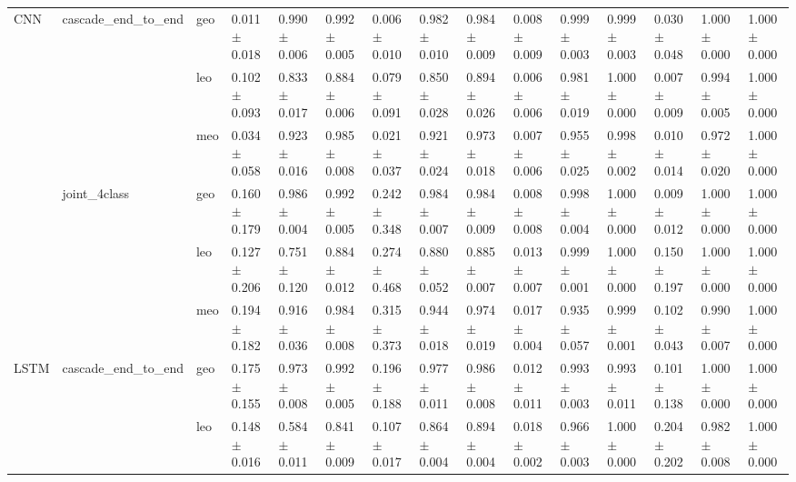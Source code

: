 \begin{table}
\begin{tabular}{lllllllllllllll}
CNN & cascade_end_to_end & geo &  0.011 $\pm$ 0.018 &  0.990 $\pm$ 0.006 &          0.992 $\pm$ 0.005 &  0.006 $\pm$ 0.010 &  0.982 $\pm$ 0.010 &          0.984 $\pm$ 0.009 &  0.008 $\pm$ 0.009 &  0.999 $\pm$ 0.003 &          0.999 $\pm$ 0.003 &  0.030 $\pm$ 0.048 &  1.000 $\pm$ 0.000 &          1.000 $\pm$ 0.000 \\
            &              & leo &  0.102 $\pm$ 0.093 &  0.833 $\pm$ 0.017 &          0.884 $\pm$ 0.006 &  0.079 $\pm$ 0.091 &  0.850 $\pm$ 0.028 &          0.894 $\pm$ 0.026 &  0.006 $\pm$ 0.006 &  0.981 $\pm$ 0.019 &          1.000 $\pm$ 0.000 &  0.007 $\pm$ 0.009 &  0.994 $\pm$ 0.005 &          1.000 $\pm$ 0.000 \\
            &              & meo &  0.034 $\pm$ 0.058 &  0.923 $\pm$ 0.016 &          0.985 $\pm$ 0.008 &  0.021 $\pm$ 0.037 &  0.921 $\pm$ 0.024 &          0.973 $\pm$ 0.018 &  0.007 $\pm$ 0.006 &  0.955 $\pm$ 0.025 &          0.998 $\pm$ 0.002 &  0.010 $\pm$ 0.014 &  0.972 $\pm$ 0.020 &          1.000 $\pm$ 0.000 \\
            & joint_4class & geo &  0.160 $\pm$ 0.179 &  0.986 $\pm$ 0.004 &          0.992 $\pm$ 0.005 &  0.242 $\pm$ 0.348 &  0.984 $\pm$ 0.007 &          0.984 $\pm$ 0.009 &  0.008 $\pm$ 0.008 &  0.998 $\pm$ 0.004 &          1.000 $\pm$ 0.000 &  0.009 $\pm$ 0.012 &  1.000 $\pm$ 0.000 &          1.000 $\pm$ 0.000 \\
            &              & leo &  0.127 $\pm$ 0.206 &  0.751 $\pm$ 0.120 &          0.884 $\pm$ 0.012 &  0.274 $\pm$ 0.468 &  0.880 $\pm$ 0.052 &          0.885 $\pm$ 0.007 &  0.013 $\pm$ 0.007 &  0.999 $\pm$ 0.001 &          1.000 $\pm$ 0.000 &  0.150 $\pm$ 0.197 &  1.000 $\pm$ 0.000 &          1.000 $\pm$ 0.000 \\
            &              & meo &  0.194 $\pm$ 0.182 &  0.916 $\pm$ 0.036 &          0.984 $\pm$ 0.008 &  0.315 $\pm$ 0.373 &  0.944 $\pm$ 0.018 &          0.974 $\pm$ 0.019 &  0.017 $\pm$ 0.004 &  0.935 $\pm$ 0.057 &          0.999 $\pm$ 0.001 &  0.102 $\pm$ 0.043 &  0.990 $\pm$ 0.007 &          1.000 $\pm$ 0.000 \\
LSTM & cascade_end_to_end & geo &  0.175 $\pm$ 0.155 &  0.973 $\pm$ 0.008 &          0.992 $\pm$ 0.005 &  0.196 $\pm$ 0.188 &  0.977 $\pm$ 0.011 &          0.986 $\pm$ 0.008 &  0.012 $\pm$ 0.011 &  0.993 $\pm$ 0.003 &          0.993 $\pm$ 0.011 &  0.101 $\pm$ 0.138 &  1.000 $\pm$ 0.000 &          1.000 $\pm$ 0.000 \\
            &              & leo &  0.148 $\pm$ 0.016 &  0.584 $\pm$ 0.011 &          0.841 $\pm$ 0.009 &  0.107 $\pm$ 0.017 &  0.864 $\pm$ 0.004 &          0.894 $\pm$ 0.004 &  0.018 $\pm$ 0.002 &  0.966 $\pm$ 0.003 &          1.000 $\pm$ 0.000 &  0.204 $\pm$ 0.202 &  0.982 $\pm$ 0.008 &          1.000 $\pm$ 0.000 \\

\end{tabular}
\end{table}

